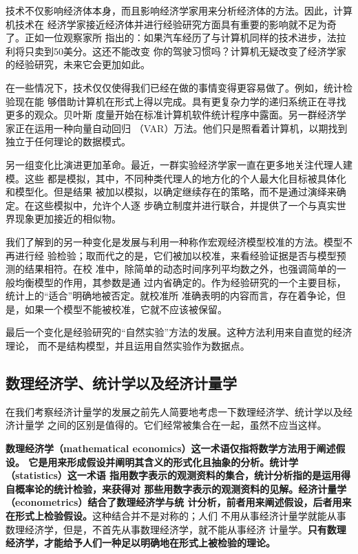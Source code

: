 技术不仅影响经济体本身，而且影响经济学家用来分析经济体的方法。因此，计算机技术在
经济学家接近经济体并进行经验研究方面具有重要的影响就不足为奇了。正如一位观察家所
指出的：如果汽车经历了与计算机同样的技术进步，法拉利将只卖到50美分。这还不能改变
你的驾驶习惯吗？计算机无疑改变了经济学家的经验研究，未来它会更加如此。

在一些情况下，技术仅仅使得我们已经在做的事情变得更容易做了。例如，统计检验现在能
够借助计算机在形式上得以完成。具有更复杂力学的递归系统正在寻找更多的观众。贝叶斯
度量开始在标准计算机软件统计程序中露面。另一群经济学家正在运用一种向量自动回归
（VAR）万法。他们只是照看着计算机，以期找到独立于任何理论的数据模式。

另一组变化比演进更加革命。最近，一群实验经济学家一直在更多地关注代理人建模。这些
都是模拟，其中，不同种类代理人的地方化的个人最大化目标被具体化和模型化。但是结果
被加以模拟，以确定继续存在的策略，而不是通过演绎来确定。在这些模拟中，允许个人逐
步确立制度并进行联合，并提供了一个与真实世界现象更加接近的相似物。

我们了解到的另一种变化是发展与利用一种称作宏观经济模型校准的方法。模型不再进行经
验检验；取而代之的是，它们被加以校准，来看经验证据是否与模型预测的结果相符。在校
准中，除简单的动态时间序列平均数之外，也强调简单的一般均衡模型的作用，其参数是通
过内省确定的。作为经验研究的一个主要目标，统计上的“适合”明确地被否定。就校准所
准确表明的内容而言，存在着争论，但是，如果一个模型不能被校准，它就不应该被保留。

最后一个变化是经验研究的“自然实验”方法的发展。这种方法利用来自直觉的经济理论，
而不是结构模型，并且运用自然实验作为数据点。

\subsection{数理经济学、统计学以及经济计量学}

在我们考察经济计量学的发展之前先人简要地考虑一下数理经济学、统计学以及经济计量学
之间的区别是值得的。它们经常被集合在一起，虽然不应当这样。

\textbf{数理经济学（mathematical economics）这一术语仅指将数学方法用于阐述假设。
  它是用来形成假设并阐明其含义的形式化且抽象的分析。统计学（statistics）这一术语
  指用数字表示的观测资料的集合，统计分析指的是运用得自概率论的统计检验，来获得对
  那些用数字表示的观测资料的见解。经济计量学（econometrics）结合了数理经济学与统
  计分析，前者用来阐述假设，后者用来在形式上检验假设。}这种结合并不是对称的；人们
不用从事经济计量学就能从事数理经济学，但是，不首先从事数理经济学，就不能从事经济
计量学。\textbf{只有数理经济学，才能给予人们一种足以明确地在形式上被检验的理论。}

